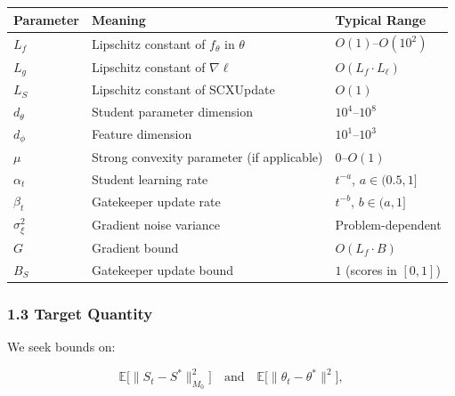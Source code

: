 \documentclass[
  12pt,
]{ctexart}
\begin{document}
\begin{longtable}[]{@{}
  >{\raggedright\arraybackslash}p{}
  >{\raggedright\arraybackslash}p{}
  >{\raggedright\arraybackslash}p{}@{}}
\toprule\noalign{}
\begin{minipage}[b]{\linewidth}\raggedright
Parameter
\end{minipage} & \begin{minipage}[b]{\linewidth}\raggedright
Meaning
\end{minipage} & \begin{minipage}[b]{\linewidth}\raggedright
Typical Range
\end{minipage} \\
\midrule\noalign{}
\endhead
\bottomrule\noalign{}
\endlastfoot
\(L_f\) & Lipschitz constant of \(f_\theta\) in \(\theta\) &
\(O(1)\)--\(O(10^2)\) \\
\(L_g\) & Lipschitz constant of \(\nabla \ell\) &
\(O(L_f \cdot L_\ell)\) \\
\(L_S\) & Lipschitz constant of SCXUpdate & \(O(1)\) \\
\(d_\theta\) & Student parameter dimension & \(10^4\)--\(10^8\) \\
\(d_\phi\) & Feature dimension & \(10^1\)--\(10^3\) \\
\(\mu\) & Strong convexity parameter (if applicable) &
\(0\)--\(O(1)\) \\
\(\alpha_t\) & Student learning rate & \(t^{-a}\), \(a \in (0.5, 1]\) \\
\(\beta_t\) & Gatekeeper update rate & \(t^{-b}\), \(b \in (a, 1]\) \\
\(\sigma_\xi^2\) & Gradient noise variance & Problem-dependent \\
\(G\) & Gradient bound & \(O(L_f \cdot B)\) \\
\(B_S\) & Gatekeeper update bound & \(1\) (scores in \([0,1]\)) \\
\end{longtable}

\subsubsection{1.3 Target Quantity}\label{target-quantity}

We seek bounds on:

\[\mathbb{E}\bigl[\|S_t - S^*\|_{M_0}^2\bigr] \quad \text{and} \quad \mathbb{E}\bigl[\|\theta_t - \theta^*\|^2\bigr],\]
\end{document}
